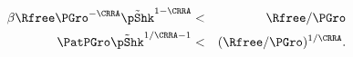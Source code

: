 \begin{eqnarray}
    \beta \Rfree \PGro^{-\CRRA} \tilde{\pShk}^{1-\CRRA}  & < & \Rfree/\PGro  
\\ \PatPGro \tilde{\pShk}^{1/\CRRA-1} & < & (\Rfree/\PGro)^{1/\CRRA} \label{eq:FVACAlt}.
\end{eqnarray}
